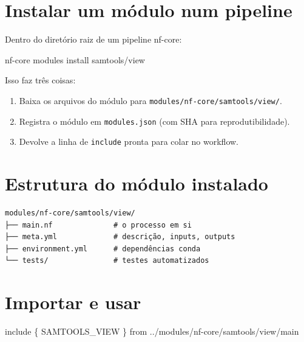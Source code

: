 \documentclass[
  brazilian,
  letterpaper,
  DIV=11,
  numbers=noendperiod]{scrreprt}
\newenvironment{Shaded}{\begin{snugshade}}{\end{snugshade}}
\newcommand{\ExtensionTok}[1]{\textcolor[rgb]{0.00,0.23,0.31}{#1}}
\newcommand{\NormalTok}[1]{\textcolor[rgb]{0.00,0.23,0.31}{#1}}
\newcommand{\OperatorTok}[1]{\textcolor[rgb]{0.37,0.37,0.37}{#1}}
\newcommand{\StringTok}[1]{\textcolor[rgb]{0.13,0.47,0.30}{#1}}
\providecommand{\tightlist}{%
  \setlength{\itemsep}{0pt}\setlength{\parskip}{0pt}}
\begin{document}
\section{Instalar um módulo num
pipeline}\label{instalar-um-muxf3dulo-num-pipeline}

Dentro do diretório raiz de um pipeline nf-core:

\begin{Shaded}
\begin{Highlighting}[]
\ExtensionTok{nf{-}core}\NormalTok{ modules install samtools/view}
\end{Highlighting}
\end{Shaded}

Isso faz três coisas:

\begin{enumerate}
\def\labelenumi{\arabic{enumi}.}
\tightlist
\item
  Baixa os arquivos do módulo para
  \texttt{modules/nf-core/samtools/view/}.
\item
  Registra o módulo em \texttt{modules.json} (com SHA para
  reprodutibilidade).
\item
  Devolve a linha de \texttt{include} pronta para colar no workflow.
\end{enumerate}

\section{Estrutura do módulo
instalado}\label{estrutura-do-muxf3dulo-instalado}

\begin{verbatim}
modules/nf-core/samtools/view/
├── main.nf              # o processo em si
├── meta.yml             # descrição, inputs, outputs
├── environment.yml      # dependências conda
└── tests/               # testes automatizados
\end{verbatim}

\section{Importar e usar}\label{importar-e-usar}

\begin{Shaded}
\begin{Highlighting}[]
\NormalTok{include }\OperatorTok{\{}\NormalTok{ SAMTOOLS\_VIEW }\OperatorTok{\}}\NormalTok{ from }\StringTok{\textquotesingle{}../modules/nf{-}core/samtools/view/main\textquotesingle{}}
\end{Highlighting}
\end{Shaded}
\end{document}
